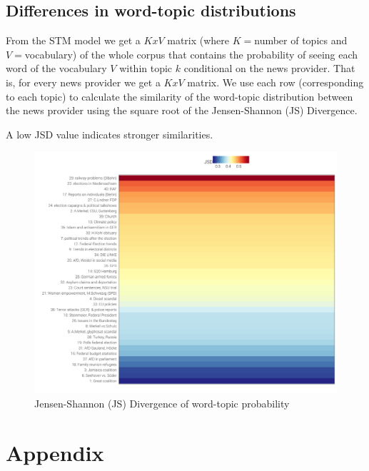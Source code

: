 \documentclass[12pt,a4paper,notitlepage]{article}
\begin{document}
\subsection{Differences in word-topic distributions}

From the STM model we get a $KxV$ matrix (where $K=$number of topics and $V=$vocabulary) of the whole corpus that contains the probability of seeing each word of the vocabulary $V$ within topic $k$ conditional on the news provider. That is, for every news provider we get a $KxV$ matrix. We use each row (corresponding to each topic) to calculate the similarity of the word-topic distribution between the news provider using the square root of the Jensen-Shannon (JS) Divergence.

A low JSD value indicates stronger similarities.

\begin{figure}[H]
	\begin{center}
	\includegraphics[width=\textwidth,keepaspectratio]{../figs/jsd.png}
	\caption{Jensen-Shannon (JS) Divergence of word-topic probability}
	\label{fig_jsd}
	\end{center}
\end{figure}


\section*{Appendix}
\end{document}
